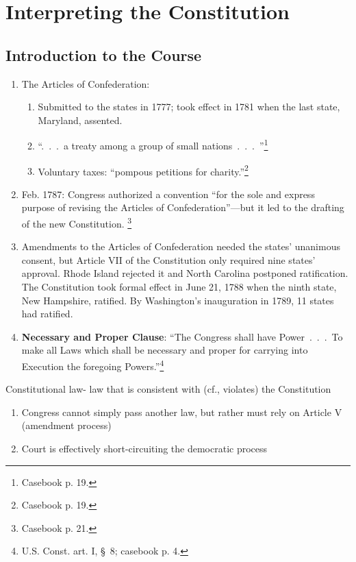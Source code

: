 \section{Interpreting the Constitution}

\subsection{Introduction to the Course}

\begin{enumerate}
    \item The Articles of Confederation:
    \begin{enumerate}
        \item Submitted to the states in 1777; took effect in 1781 when the 
        last state, Maryland, assented.
        \item ``.~.~.~a treaty among a group of small 
        nations~.~.~.~''\footnote{Casebook p.  19.}
        \item Voluntary taxes: ``pompous petitions for 
        charity.''\footnote{Casebook p. 19.}
    \end{enumerate}
    \item Feb. 1787: Congress authorized a convention ``for the sole and 
    express purpose of revising the Articles of 
    Confederation''---but it led to the drafting of the new Constitution. 
    \footnote{Casebook p. 21.}
    \item Amendments to the Articles of Confederation needed the states' 
    unanimous consent, but Article VII of the Constitution only required nine 
    states' approval. Rhode Island rejected it and North Carolina postponed 
    ratification. The Constitution took formal effect in June 21, 1788 when 
    the ninth state, New Hampshire, ratified. By Washington's inauguration in 
    1789, 11 states had ratified.
    \item \textbf{Necessary and Proper Clause}: ``The Congress shall have 
    Power~.~.~.~To make all Laws which shall be necessary and proper for carrying 
    into Execution the foregoing Powers.''\footnote{U.S. Const. art. I, \S\ 8; 
    casebook p. 4.}
   \end{enumerate}
    \item Constitutional law- law that is consistent with (cf., violates) the Constitution
    \begin{enumerate}
    \item Congress cannot simply pass another law, but rather must rely on Article V (amendment process)
    \item Court is effectively short-circuiting the democratic process
\end {enumerate}
